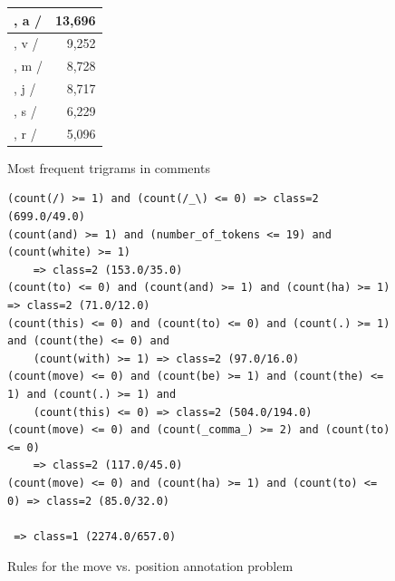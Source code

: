 \documentclass[article,type=msc,colorback,accentcolor=tud7b]{tudthesis}
\begin{document}
\begin{figure}[H]
\begin{floatrow}
{{\begin{tabular}{| l | r |}
		, a / & 13,696 \\ \hline
		, v / & 9,252 \\ \hline
		, m / & 8,728 \\ \hline
		, j / & 8,717 \\ \hline
		, s / & 6,229 \\ \hline
		, r / & 5,096 \\ \hline
      \end{tabular}
      }
      \quad
      }{%
        \caption{Most frequent trigrams in comments}
        \label{tab:frequent_trigrams}
      }
      \end{floatrow}
	\end{figure}

	\begin{figure}[H]
	  \centering
	  \begin{lstlisting}	  
(count(/) >= 1) and (count(/_\) <= 0) => class=2 (699.0/49.0)
(count(and) >= 1) and (number_of_tokens <= 19) and (count(white) >= 1) 
	=> class=2 (153.0/35.0)
(count(to) <= 0) and (count(and) >= 1) and (count(ha) >= 1) => class=2 (71.0/12.0)
(count(this) <= 0) and (count(to) <= 0) and (count(.) >= 1) and (count(the) <= 0) and 
	(count(with) >= 1) => class=2 (97.0/16.0)
(count(move) <= 0) and (count(be) >= 1) and (count(the) <= 1) and (count(.) >= 1) and 
	(count(this) <= 0) => class=2 (504.0/194.0)
(count(move) <= 0) and (count(_comma_) >= 2) and (count(to) <= 0) 
	=> class=2 (117.0/45.0)
(count(move) <= 0) and (count(ha) >= 1) and (count(to) <= 0) => class=2 (85.0/32.0)

 => class=1 (2274.0/657.0)
	  \end{lstlisting}
      \caption{Rules for the move vs. position annotation problem}
      \label{fig:move_vs_position_rules}
	\end{figure}
	
\end{document}
